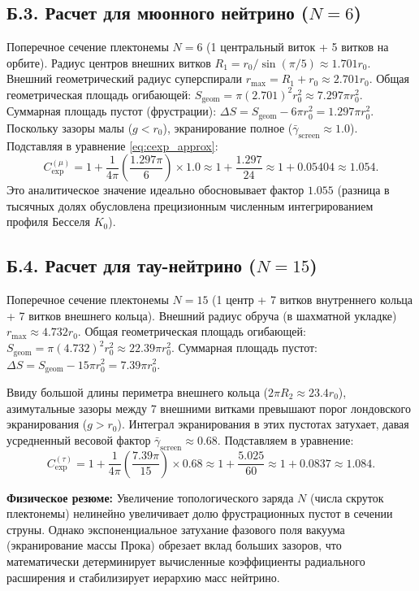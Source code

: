 \documentclass[11pt,a4paper]{article}
\begin{document}
\subsection*{Б.3. Расчет для мюонного нейтрино ($N=6$)}
Поперечное сечение плектонемы $N=6$ (1 центральный виток + 5 витков на орбите). 
Радиус центров внешних витков $R_1 = r_0 / \sin(\pi/5) \approx 1.701 r_0$. 
Внешний геометрический радиус суперспирали $r_{\text{max}} = R_1 + r_0 \approx 2.701 r_0$.
Общая геометрическая площадь огибающей: $S_{\text{geom}} = \pi (2.701)^2 r_0^2 \approx 7.297 \pi r_0^2$.
Суммарная площадь пустот (фрустрации): $\Delta S = S_{\text{geom}} - 6 \pi r_0^2 = 1.297 \pi r_0^2$.
Поскольку зазоры малы ($g < r_0$), экранирование полное ($\bar{\gamma}_{\text{screen}} \approx 1.0$). Подставляя в уравнение \eqref{eq:cexp_approx}:
\begin{equation}
C_{\text{exp}}^{(\mu)} = 1 + \frac{1}{4\pi} \left( \frac{1.297 \pi}{6} \right) \times 1.0 \approx 1 + \frac{1.297}{24} \approx 1 + 0.05404 \approx \mathbf{1.054}.
\end{equation}
Это аналитическое значение идеально обосновывает фактор $1.055$ (разница в тысячных долях обусловлена прецизионным численным интегрированием профиля Бесселя $K_0$).

\subsection*{Б.4. Расчет для тау-нейтрино ($N=15$)}
Поперечное сечение плектонемы $N=15$ (1 центр + 7 витков внутреннего кольца + 7 витков внешнего кольца).
Внешний радиус обруча (в шахматной укладке) $r_{\text{max}} \approx 4.732 r_0$.
Общая геометрическая площадь огибающей: $S_{\text{geom}} = \pi (4.732)^2 r_0^2 \approx 22.39 \pi r_0^2$.
Суммарная площадь пустот: $\Delta S = S_{\text{geom}} - 15 \pi r_0^2 = 7.39 \pi r_0^2$.

Ввиду большой длины периметра внешнего кольца ($2\pi R_2 \approx 23.4 r_0$), азимутальные зазоры между 7 внешними витками превышают порог лондовского экранирования ($g > r_0$). Интеграл экранирования в этих пустотах затухает, давая усредненный весовой фактор $\bar{\gamma}_{\text{screen}} \approx 0.68$.
Подставляем в уравнение:
\begin{equation}
C_{\text{exp}}^{(\tau)} = 1 + \frac{1}{4\pi} \left( \frac{7.39 \pi}{15} \right) \times 0.68 \approx 1 + \frac{5.025}{60} \approx 1 + 0.0837 \approx \mathbf{1.084}.
\end{equation}

\textbf{Физическое резюме:} Увеличение топологического заряда $N$ (числа скруток плектонемы) нелинейно увеличивает долю фрустрационных пустот в сечении струны. Однако экспоненциальное затухание фазового поля вакуума (экранирование массы Прока) обрезает вклад больших зазоров, что математически детерминирует вычисленные коэффициенты радиального расширения и стабилизирует иерархию масс нейтрино.
\end{document}
